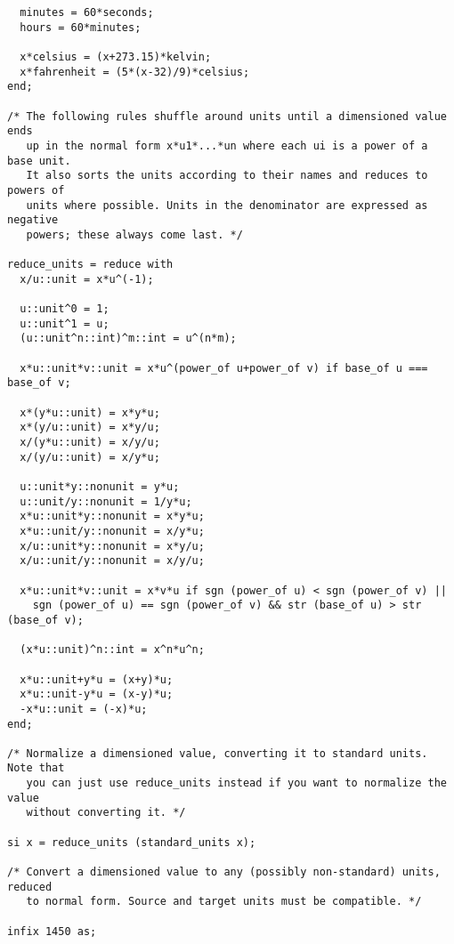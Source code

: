 \documentclass[a4paper,12pt]{article}
\begin{document}
\begin{lstlisting}
  minutes = 60*seconds;
  hours = 60*minutes;

  x*celsius = (x+273.15)*kelvin;
  x*fahrenheit = (5*(x-32)/9)*celsius;
end;

/* The following rules shuffle around units until a dimensioned value ends
   up in the normal form x*u1*...*un where each ui is a power of a base unit.
   It also sorts the units according to their names and reduces to powers of
   units where possible. Units in the denominator are expressed as negative
   powers; these always come last. */

reduce_units = reduce with
  x/u::unit = x*u^(-1);

  u::unit^0 = 1;
  u::unit^1 = u;
  (u::unit^n::int)^m::int = u^(n*m);

  x*u::unit*v::unit = x*u^(power_of u+power_of v) if base_of u === base_of v;

  x*(y*u::unit) = x*y*u;
  x*(y/u::unit) = x*y/u;
  x/(y*u::unit) = x/y/u;
  x/(y/u::unit) = x/y*u;

  u::unit*y::nonunit = y*u;
  u::unit/y::nonunit = 1/y*u;
  x*u::unit*y::nonunit = x*y*u;
  x*u::unit/y::nonunit = x/y*u;
  x/u::unit*y::nonunit = x*y/u;
  x/u::unit/y::nonunit = x/y/u;

  x*u::unit*v::unit = x*v*u if sgn (power_of u) < sgn (power_of v) ||
    sgn (power_of u) == sgn (power_of v) && str (base_of u) > str (base_of v);

  (x*u::unit)^n::int = x^n*u^n;

  x*u::unit+y*u = (x+y)*u;
  x*u::unit-y*u = (x-y)*u;
  -x*u::unit = (-x)*u;
end;

/* Normalize a dimensioned value, converting it to standard units. Note that
   you can just use reduce_units instead if you want to normalize the value
   without converting it. */

si x = reduce_units (standard_units x);

/* Convert a dimensioned value to any (possibly non-standard) units, reduced
   to normal form. Source and target units must be compatible. */

infix 1450 as;


\end{lstlisting}
\end{document}
